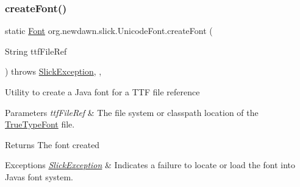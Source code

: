 \subsubsection{\texorpdfstring{create\+Font()}{createFont()}}
{\footnotesize\ttfamily static \mbox{\hyperlink{interfaceorg_1_1newdawn_1_1slick_1_1_font}{Font}} org.\+newdawn.\+slick.\+Unicode\+Font.\+create\+Font (\begin{DoxyParamCaption}\item[{String}]{ttf\+File\+Ref }\end{DoxyParamCaption}) throws \mbox{\hyperlink{classorg_1_1newdawn_1_1slick_1_1_slick_exception}{Slick\+Exception}}\hspace{0.3cm}{\ttfamily [inline]}, {\ttfamily [static]}, {\ttfamily [private]}}

Utility to create a Java font for a T\+TF file reference


\begin{DoxyParams}{Parameters}
{\em ttf\+File\+Ref} & The file system or classpath location of the \mbox{\hyperlink{classorg_1_1newdawn_1_1slick_1_1_true_type_font}{True\+Type\+Font}} file. \\
\hline
\end{DoxyParams}
\begin{DoxyReturn}{Returns}
The font created 
\end{DoxyReturn}

\begin{DoxyExceptions}{Exceptions}
{\em \mbox{\hyperlink{classorg_1_1newdawn_1_1slick_1_1_slick_exception}{Slick\+Exception}}} & Indicates a failure to locate or load the font into Java\textquotesingle{}s font system. \\
\hline
\end{DoxyExceptions}

